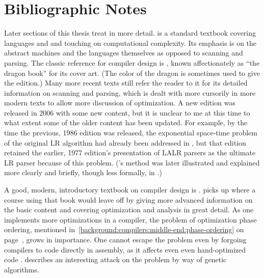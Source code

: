 \section{Bibliographic Notes}\label{background:conclusion:bibliographicnotes}
Later sections of this thesis treat \lambdacalc in more detail. %
 is a standard textbook covering languages and \TMs and touching on computational complexity. Its emphasis is on the abstract machines and the languages themselves as opposed to scanning and parsing. The classic reference for compiler design is \citet{Aho:Compilers:2006}, known affectionately as ``the dragon book'' for its cover art. (The color of the dragon is sometimes used to give the edition.) Many more recent texts still refer the reader to it for its detailed information on scanning and parsing, which is dealt with more cursorily in more modern texts to allow more discussion of optimization. A new edition was released in 2006 with some new content, but it is unclear to me at this time to what extent some of the older content has been updated. For example, by the time the previous, 1986 edition \citep{Aho:Compilers:1986} was released, the exponential space-time problem of the original LR algorithm had already been addressed in \citet{Pager:The-lane:1973}, but that edition retained the earlier, 1977 edition's \citep{Aho:Principles:1977} presentation of LALR parsers as the ultimate LR parser because of this problem. ('s method was later illustrated and explained more clearly and briefly, though less formally, in \citet{Spector:Efficient:1988}.)

A good, modern, introductory textbook on compiler design is \citet{Cooper:Engineering:2004}.  picks up where a course using that book would leave off by giving more advanced information on the basic content and covering optimization and analysis in great detail. As one implements more optimizations in a compiler, the problem of optimization phase ordering, mentioned in~\ref{background:compilers:middle-end:phase-ordering} on page~\pageref{background:compilers:middle-end:phase-ordering}, grows in importance. One cannot escape the problem even by forgoing compilers to code directly in assembly, as it affects even even hand-optimized code \citep{Hines:Using:2005}.  describes an interesting attack on the problem by way of genetic algorithms.

